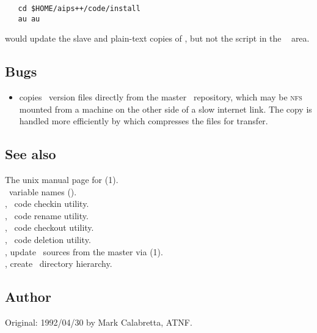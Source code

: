 \begin{verbatim}
   cd $HOME/aips++/code/install
   au au
\end{verbatim}

\noindent
would update the slave and plain-text copies of , but not the script
in the \aipspp\  area.

\subsection*{Bugs}
 
\begin{itemize}
\item
    copies \rcs\ version files directly from the master \rcs\
   repository, which may be \textsc{nfs} mounted from a machine on the other
   side of a slow internet link.  The copy is handled more efficiently by
   \exeref{rau} which compresses the files for transfer.
\end{itemize}

\subsection*{See also}

The unix manual page for (1).\\
\aipspp\ variable names ().\\
, \aipspp\ code checkin utility.\\
, \aipspp\ code rename utility.\\
, \aipspp\ code checkout utility.\\
, \aipspp\ code deletion utility.\\
, update \aipspp\ sources from the master via (1).\\
\exeref{mktree}, create \aipspp\ directory hierarchy.

\subsection*{Author}

Original: 1992/04/30 by Mark Calabretta, ATNF.


\newpage
\section{}
\label{av}


